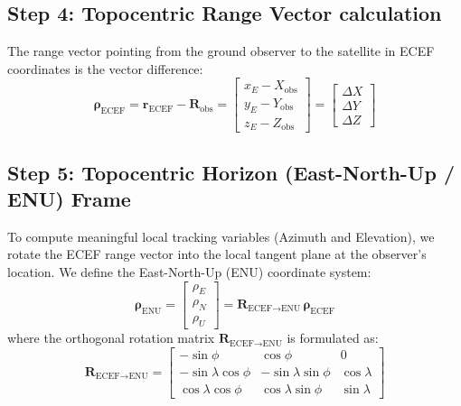 \documentclass[11pt,journal,onecolumn]{IEEEtran}
\begin{document}
\subsection{Step 4: Topocentric Range Vector calculation}
The range vector pointing from the ground observer to the satellite in ECEF coordinates is the vector difference:
\begin{equation}
\boldsymbol{\rho}_{\text{ECEF}} = \mathbf{r}_{\text{ECEF}} - \mathbf{R}_{\text{obs}} = \begin{bmatrix}
x_E - X_{\text{obs}} \\
y_E - Y_{\text{obs}} \\
z_E - Z_{\text{obs}}
\end{bmatrix} = \begin{bmatrix} \Delta X \\ \Delta Y \\ \Delta Z \end{bmatrix}
\label{eq:range_ecef}
\end{equation}

\subsection{Step 5: Topocentric Horizon (East-North-Up / ENU) Frame}
To compute meaningful local tracking variables (Azimuth and Elevation), we rotate the ECEF range vector into the local tangent plane at the observer's location. We define the East-North-Up (ENU) coordinate system:
\begin{equation}
\boldsymbol{\rho}_{\text{ENU}} = \begin{bmatrix} \rho_E \\ \rho_N \\ \rho_U \end{bmatrix} = \mathbf{R}_{\text{ECEF}\to\text{ENU}} \, \boldsymbol{\rho}_{\text{ECEF}}
\label{eq:ecef_to_enu}
\end{equation}
where the orthogonal rotation matrix $\mathbf{R}_{\text{ECEF}\to\text{ENU}}$ is formulated as:
\begin{equation}
\mathbf{R}_{\text{ECEF}\to\text{ENU}} = \begin{bmatrix}
-\sin\phi & \cos\phi & 0 \\
-\sin\lambda \cos\phi & -\sin\lambda \sin\phi & \cos\lambda \\
\cos\lambda \cos\phi & \cos\lambda \sin\phi & \sin\lambda
\end{bmatrix}
\label{eq:enu_rotation_matrix}
\end{equation}
\end{document}
